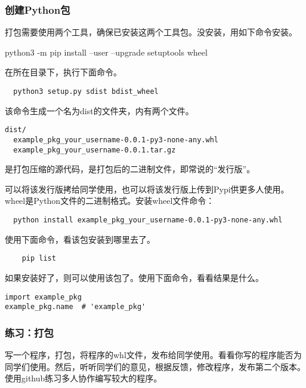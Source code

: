 \subsubsection{创建Python包}
打包需要使用两个工具，确保已安装这两个工具包。没安装，用如下命令安装。
\begin{framed}
  python3 -m pip install --user --upgrade setuptools wheel
\end{framed}

在所在目录下，执行下面命令。
\begin{framed}
\begin{verbatim}
  python3 setup.py sdist bdist_wheel
\end{verbatim}
\end{framed}

该命令生成一个名为dist的文件夹，内有两个文件。
\begin{framed}
\begin{verbatim}
dist/
  example_pkg_your_username-0.0.1-py3-none-any.whl
  example_pkg_your_username-0.0.1.tar.gz
\end{verbatim}
\end{framed}
是打包压缩的源代码，是打包后的二进制文件，即常说的“发行版”。

可以将该发行版拷给同学使用，也可以将该发行版上传到Pypi供更多人使用。wheel是Python文件的二进制格式。安装wheel文件命令：
\begin{framed}
\begin{verbatim}
  python install example_pkg_your_username-0.0.1-py3-none-any.whl
\end{verbatim}
\end{framed}
使用下面命令，看该包安装到哪里去了。
\begin{framed}
\begin{verbatim}
    pip list
\end{verbatim}
\end{framed}
如果安装好了，则可以使用该包了。使用下面命令，看看结果是什么。
\begin{framed}
\begin{verbatim}
import example_pkg
example_pkg.name  # 'example_pkg'
\end{verbatim}
\end{framed}
\subsubsection{练习：打包}
写一个程序，打包，将程序的whl文件，发布给同学使用。看看你写的程序能否为同学们使用。然后，听听同学们的意见，根据反馈，修改程序，发布第二个版本。
使用github练习多人协作编写较大的程序。
